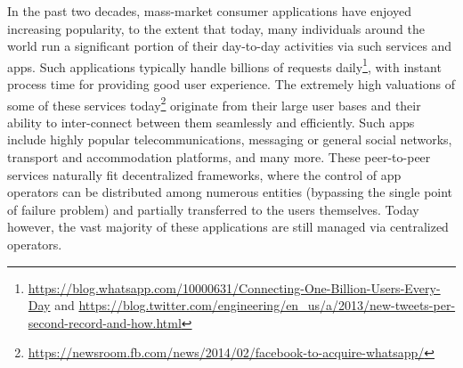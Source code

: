 In the past two decades, mass-market consumer applications have enjoyed increasing popularity, to the extent that today, many individuals around the world run a significant portion of their day-to-day activities via such services and apps. Such applications typically handle billions of requests daily\footnote{\url{https://blog.whatsapp.com/10000631/Connecting-One-Billion-Users-Every-Day} and \newline \url{https://blog.twitter.com/engineering/en_us/a/2013/new-tweets-per-second-record-and-how.html}}, with instant process time for providing good user experience. The extremely high valuations of some of these services today\footnote{\url{https://newsroom.fb.com/news/2014/02/facebook-to-acquire-whatsapp/}} originate from their large user bases and their ability to inter-connect between them seamlessly and efficiently. Such apps include highly popular telecommunications, messaging or general social networks, transport and accommodation platforms, and many more. 
These peer-to-peer services naturally fit decentralized frameworks, where the control of app operators can be distributed among numerous entities (bypassing the single point of failure problem) and partially transferred to the users themselves. Today however, the vast majority of these applications are still managed via centralized operators.


